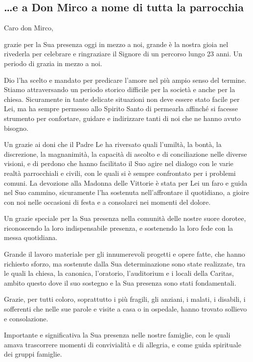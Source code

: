 \subsection{\dots e a Don Mirco a nome di tutta la parrocchia}

Caro don Mirco,

grazie per la Sua presenza oggi in mezzo a noi, grande è la nostra gioia nel rivederla per celebrare e ringraziare il Signore di un percorso lungo 23 anni. Un periodo di grazia in mezzo a noi. 

Dio l’ha scelto e mandato per predicare l’amore nel più ampio senso del termine. Stiamo attraversando un periodo storico difficile per la società e anche per la chiesa. Sicuramente in tante delicate situazioni non deve essere stato facile per Lei, ma ha sempre permesso allo Spirito Santo di permearla affinché si facesse strumento per confortare, guidare e indirizzare tanti di noi che ne hanno avuto bisogno.

Un grazie ai doni che il Padre Le ha riversato quali l’umiltà, la bontà, la discrezione, la magnanimità, la capacità di ascolto e di conciliazione nelle diverse visioni, e di perdono che hanno facilitato il Suo agire nel dialogo con le varie realtà parrocchiali e civili, con le quali si è sempre confrontato per i problemi comuni. La devozione alla Madonna delle Vittorie è stata per Lei un faro e guida nel Suo cammino, sicuramente l’ha sostenuta nell’affrontare il quotidiano, a gioire con noi nelle occasioni di festa e a consolarci nei momenti del dolore.

Un grazie speciale per la Sua presenza nella comunità delle nostre suore dorotee, riconoscendo la loro indispensabile presenza, e sostenendo la loro fede con la messa quotidiana. 

Grande il lavoro materiale per gli innumerevoli progetti e opere fatte, che hanno richiesto sforzo, ma sostenute dalla Sua determinazione sono state realizzate, tra le quali la chiesa, la canonica, l’oratorio, l’auditorium e i locali della Caritas, ambito questo dove il suo sostegno e la Sua presenza sono stati fondamentali.

Grazie, per tutti coloro, soprattutto i più fragili, gli anziani, i malati, i disabili, i sofferenti che nelle sue parole e visite a casa o in ospedale, hanno trovato sollievo e consolazione. 

Importante e significativa la Sua presenza nelle nostre famiglie, con le quali amava trascorrere momenti di convivialità e di allegria, e come guida spirituale dei gruppi famiglie.

